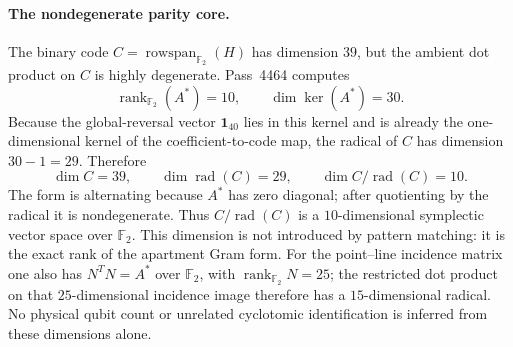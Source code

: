 \paragraph{The nondegenerate parity core.}
The binary code $C=\operatorname{rowspan}_{\mathbb F_2}(H)$ has dimension $39$,
but the ambient dot product on $C$ is highly degenerate.  Pass~4464 computes
\[
 \operatorname{rank}_{\mathbb F_2}(A^\ast)=10,
 \qquad
 \dim\ker(A^\ast)=30.
\]
Because the global-reversal vector $\mathbf1_{40}$ lies in this kernel and is
already the one-dimensional kernel of the coefficient-to-code map, the radical
of $C$ has dimension $30-1=29$.  Therefore
\begin{equation}
 \boxed{\dim C=39,\qquad \dim\operatorname{rad}(C)=29,\qquad
 \dim C/\operatorname{rad}(C)=10.}
 \label{eq:pass4464-symplectic-quotient}
\end{equation}
The form is alternating because $A^\ast$ has zero diagonal; after quotienting
by the radical it is nondegenerate.  Thus $C/\operatorname{rad}(C)$ is a
$10$-dimensional symplectic vector space over $\mathbb F_2$.  This dimension is
not introduced by pattern matching: it is the exact rank of the apartment Gram
form.  For the point--line incidence matrix one also has
$N^TN=A^\ast$ over $\mathbb F_2$, with
$\operatorname{rank}_{\mathbb F_2}N=25$; the restricted dot product on that
$25$-dimensional incidence image therefore has a $15$-dimensional radical.
No physical qubit count or unrelated cyclotomic identification is inferred from
these dimensions alone.

\begin{center}
\end{center}

